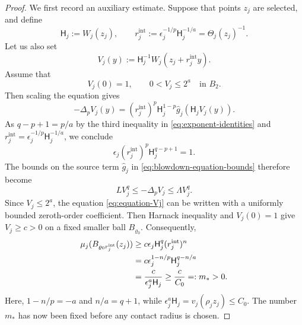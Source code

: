 \documentclass[reqno,12pt]{amsart}
\numberwithin{equation}{section}
\theoremstyle{remark}
\begin{document}
\begin{proof}
We first record an auxiliary  estimate.
Suppose that points $z_j$ are selected, and define
\begin{equation}\label{eq:defn-rjint}
\mathsf H_j:=W_j(z_j),
\qquad r_j^{\mathrm{int}} :=\epsilon_j^{-1/p}\mathsf H_j^{-1/a} =\Theta_j(z_j)^{-1}.
\end{equation}
Let us also set
\begin{equation}\label{eq:intrinsic-rescaled-contact}
    V_j(y):=\mathsf H_j^{-1} W_j(z_j+r_j^{\mathrm{int}}y).
\end{equation}
Assume that
$$
V_j(0)=1,
\qquad 0<V_j\le2^a \quad\text{in }B_2.
$$
 Then scaling the equation gives
$$
 -\Delta_pV_j(y) =(r_j^{\mathrm{int}})^p\mathsf H_j^{1-p} \widehat g_j(\mathsf H_jV_j(y)).
$$
As $q-p+1=p/a$ by the third inequality in \eqref{eq:exponent-identities} and $r_j^{\mathrm{int}}=\epsilon_j^{-1/p}\mathsf H_j^{-1/a}$, we conclude
$$
 \epsilon_j(r_j^{\mathrm{int}})^p \mathsf H_j^{q-p+1}=1.
$$
The bounds on the source term $\widehat g_j$ in \eqref{eq:blowdown-equation-bounds} therefore become
\begin{equation}\label{eq:equation-Vj}
LV_j^q\le-\Delta_pV_j\le\Lambda V_j^q.
\end{equation}
Since $V_j\le 2^a$, the equation \eqref{eq:equation-Vj} can be written with a uniformly bounded zeroth-order coefficient.  Then Harnack inequality and $V_j(0)=1$ give $V_j\ge c>0$ on a fixed smaller  ball $B_{\varrho_0}$.  Consequently,
\begin{align}
 \mu_j(B_{\varrho_0r_j^{\mathrm{int}}}(z_j))
 &\ge c\epsilon_j\mathsf H_j^q
(r_j^{\mathrm{int}})^n\notag\\
 &=c\epsilon_j^{1-n/p} \mathsf H_j^{q-n/a}\notag\\
 &=\frac{c}{\epsilon_j^a\mathsf H_j} \ge\frac{c}{C_0}=:m_*>0.
 \label{eq:source-quantum}
\end{align}
Here, $1-n/p=-a$ and $n/a=q+1$, while
$\epsilon_j^a\mathsf H_j=v_j(\rho_jz_j)\le C_0$.  The number $m_*$ has now been fixed before any contact radius is chosen.


\end{proof}
\end{document}
